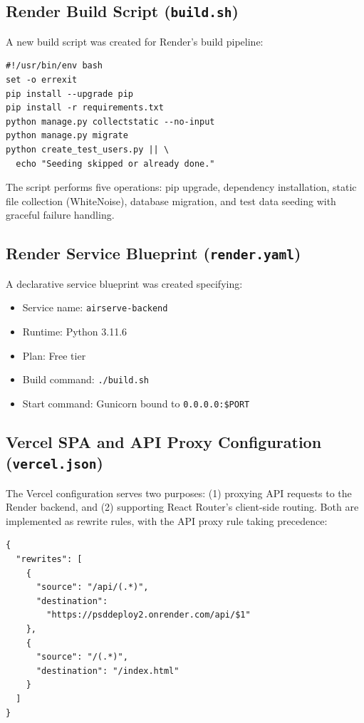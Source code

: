 \documentclass[conference]{IEEEtran}
\begin{document}
\subsection{Render Build Script (\texttt{build.sh})}
\label{sec:buildsh}

A new build script was created for Render's build pipeline:

\begin{lstlisting}[caption={Render build script (build.sh)}]
#!/usr/bin/env bash
set -o errexit
pip install --upgrade pip
pip install -r requirements.txt
python manage.py collectstatic --no-input
python manage.py migrate
python create_test_users.py || \
  echo "Seeding skipped or already done."
\end{lstlisting}

The script performs five operations: pip upgrade, dependency installation, static file collection (WhiteNoise), database migration, and test data seeding with graceful failure handling.

\subsection{Render Service Blueprint (\texttt{render.yaml})}

A declarative service blueprint was created specifying:

\begin{itemize}
    \item Service name: \texttt{airserve-backend}
    \item Runtime: Python 3.11.6
    \item Plan: Free tier
    \item Build command: \texttt{./build.sh}
    \item Start command: Gunicorn bound to \texttt{0.0.0.0:\$PORT}
\end{itemize}

\subsection{Vercel SPA and API Proxy Configuration (\texttt{vercel.json})}
\label{sec:vercelconf}

The Vercel configuration serves two purposes: (1) proxying API requests to the Render backend, and (2) supporting React Router's client-side routing. Both are implemented as rewrite rules, with the API proxy rule taking precedence:

\begin{lstlisting}[caption={Vercel rewrite rules (vercel.json)}]
{
  "rewrites": [
    {
      "source": "/api/(.*)",
      "destination":
        "https://psddeploy2.onrender.com/api/$1"
    },
    {
      "source": "/(.*)",
      "destination": "/index.html"
    }
  ]
}
\end{lstlisting}
\end{document}
